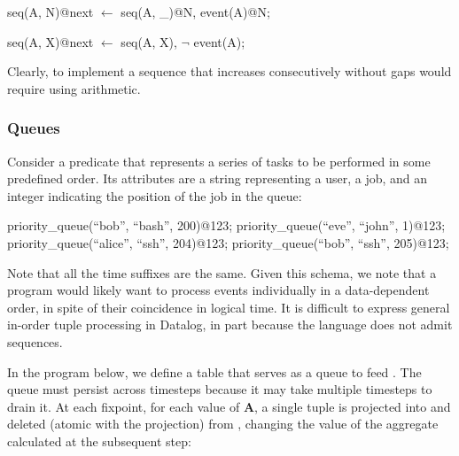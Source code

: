 \begin{Dedalus}
seq(A, N)@next \(\leftarrow\) seq(A, _)@N, event(A)@N;
  
seq(A, X)@next \(\leftarrow\) seq(A, X), \(\lnot\) event(A);
\end{Dedalus}


Clearly, to implement a sequence that increases consecutively without gaps would require using arithmetic.


\subsubsection{Queues}

Consider a predicate  that represents a series of tasks to be performed in some predefined order.  Its attributes are a string representing a user, a job, and an integer
indicating the position of the job in the queue:

\begin{Dedalus}
priority\_queue(``bob'', ``bash'', 200)@123;
priority\_queue(``eve'', ``john'', 1)@123;
priority\_queue(``alice'', ``ssh'', 204)@123;
priority\_queue(``bob'', ``ssh'', 205)@123;
\end{Dedalus}

Note that all the time suffixes are the same.  
Given this schema, we note that a program would likely want to process
 events individually in a data-dependent order, in
spite of their coincidence in logical time.  It is difficult to express general
in-order tuple processing in Datalog, in part because the language does not
admit sequences.

In the program below, we define a table  that
serves as a queue to feed .  The queue must persist
across timesteps because it may take multiple timesteps to drain it.  At each
fixpoint, for each value of \textbf{A}, a single tuple is projected into
 and deleted (atomic with the projection) from
, changing the value of the aggregate calculated
at the subsequent step:

